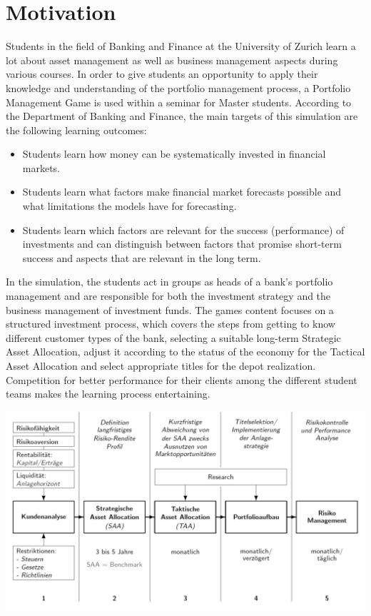 \section{Motivation}
\label{sec:motivation}

Students in the field of Banking and Finance at the University of Zurich learn a lot about asset management as well as business management aspects during various courses. In order to give students an opportunity to apply their knowledge and understanding of the portfolio management process, a Portfolio Management Game is used within a seminar for Master students. According to the Department of Banking and Finance, the main targets of this simulation are the following learning outcomes:
\begin{itemize}
  \item Students learn how money can be systematically invested in financial markets.
  \item Students learn what factors make financial market forecasts possible and what limitations the models have for forecasting.
  \item Students learn which factors are relevant for the success (performance) of investments and can distinguish between factors that promise short-term success and aspects that are relevant in the long term.
\end{itemize}

In the simulation, the students act in groups as heads of a bank’s portfolio management and are responsible for both the investment strategy and the business management of investment funds. The games content focuses on a structured investment process, which covers the steps from getting to know different customer types of the bank, selecting a suitable long-term Strategic Asset Allocation, adjust it according to the status of the economy for the Tactical Asset Allocation and select appropriate titles for the depot realization. Competition for better performance for their clients among the different student teams makes the learning process entertaining.

\begin{center}
  \includegraphics[scale=0.5]{img/private_banking_process.png}
\end{center}


